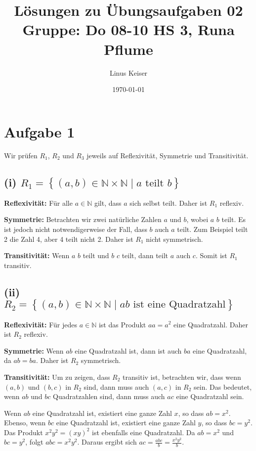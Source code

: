 \documentclass[12pt]{article}
\title{Lösungen zu Übungsaufgaben 02 \\ \small Gruppe: Do 08-10 HS 3, Runa Pflume}
\author{Linus Keiser}
\date{\today}
\begin{document}
\maketitle

\section*{Aufgabe 1}

Wir prüfen \(R_1\), \(R_2\) und \(R_3\) jeweils auf Reflexivität, Symmetrie und Transitivität.

\subsection*{(i) \(R_1 = \left\{ (a, b) \in \mathbb{N} \times \mathbb{N} \mid a \text{ teilt } b \right\}\)}

\textbf{Reflexivität:} Für alle \(a \in \mathbb{N}\) gilt, dass \(a\) sich selbst teilt. Daher ist \(R_1\) reflexiv.

\textbf{Symmetrie:} Betrachten wir zwei natürliche Zahlen \(a\) und \(b\), wobei \(a\) \(b\) teilt. Es ist jedoch nicht notwendigerweise der Fall, dass \(b\) auch \(a\) teilt. Zum Beispiel teilt 2 die Zahl 4, aber 4 teilt nicht 2. Daher ist \(R_1\) nicht symmetrisch.

\textbf{Transitivität:} Wenn \(a\) \(b\) teilt und \(b\) \(c\) teilt, dann teilt \(a\) auch \(c\). Somit ist \(R_1\) transitiv.

\subsection*{(ii) \(R_2 = \left\{ (a, b) \in \mathbb{N} \times \mathbb{N} \mid ab \text{ ist eine Quadratzahl} \right\}\)}

\textbf{Reflexivität:} Für jedes \(a \in \mathbb{N}\) ist das Produkt \(aa = a^2\) eine Quadratzahl. Daher ist \(R_2\) reflexiv.

\textbf{Symmetrie:} Wenn \(ab\) eine Quadratzahl ist, dann ist auch \(ba\) eine Quadratzahl, da \(ab = ba\). Daher ist \(R_2\) symmetrisch.

\textbf{Transitivität:} Um zu zeigen, dass \( R_2 \) transitiv ist, betrachten wir, dass wenn \( (a, b) \) und \( (b, c) \) in \( R_2 \) sind, dann muss auch \( (a, c) \) in \( R_2 \) sein. Das bedeutet, wenn \( ab \) und \( bc \) Quadratzahlen sind, dann muss auch \( ac \) eine Quadratzahl sein.

Wenn \( ab \) eine Quadratzahl ist, existiert eine ganze Zahl \( x \), so dass \( ab = x^2 \). Ebenso, wenn \( bc \) eine Quadratzahl ist, existiert eine ganze Zahl \( y \), so dass \( bc = y^2 \). Das Produkt \( x^2y^2 = (xy)^2 \) ist ebenfalls eine Quadratzahl. Da \( ab = x^2 \) und \( bc = y^2 \), folgt \( abc = x^2y^2 \). Daraus ergibt sich \( ac = \frac{abc}{b} = \frac{x^2y^2}{b} \).
\end{document}

